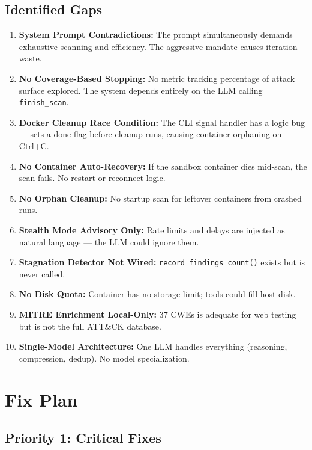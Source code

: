 \documentclass[12pt,a4paper]{report}
\begin{document}
\section{Identified Gaps}

\begin{enumerate}
    \item \textbf{System Prompt Contradictions:} The prompt simultaneously demands exhaustive scanning and efficiency. The aggressive mandate causes iteration waste.
    \item \textbf{No Coverage-Based Stopping:} No metric tracking percentage of attack surface explored. The system depends entirely on the LLM calling \texttt{finish\_scan}.
    \item \textbf{Docker Cleanup Race Condition:} The CLI signal handler has a logic bug --- sets a done flag before cleanup runs, causing container orphaning on Ctrl+C.
    \item \textbf{No Container Auto-Recovery:} If the sandbox container dies mid-scan, the scan fails. No restart or reconnect logic.
    \item \textbf{No Orphan Cleanup:} No startup scan for leftover containers from crashed runs.
    \item \textbf{Stealth Mode Advisory Only:} Rate limits and delays are injected as natural language --- the LLM could ignore them.
    \item \textbf{Stagnation Detector Not Wired:} \texttt{record\_findings\_count()} exists but is never called.
    \item \textbf{No Disk Quota:} Container has no storage limit; tools could fill host disk.
    \item \textbf{MITRE Enrichment Local-Only:} 37 CWEs is adequate for web testing but is not the full ATT\&CK database.
    \item \textbf{Single-Model Architecture:} One LLM handles everything (reasoning, compression, dedup). No model specialization.
\end{enumerate}


\chapter{Fix Plan}

\section{Priority 1: Critical Fixes}
\end{document}
